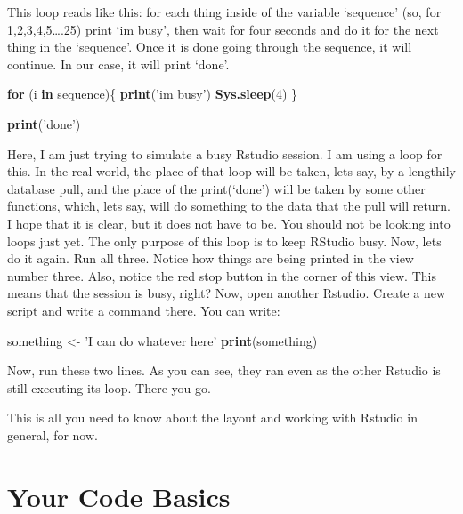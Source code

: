 \documentclass[]{book}
\newenvironment{Shaded}{\begin{snugshade}}{\end{snugshade}}
\newcommand{\ControlFlowTok}[1]{\textcolor[rgb]{0.13,0.29,0.53}{\textbf{#1}}}
\newcommand{\DecValTok}[1]{\textcolor[rgb]{0.00,0.00,0.81}{#1}}
\newcommand{\KeywordTok}[1]{\textcolor[rgb]{0.13,0.29,0.53}{\textbf{#1}}}
\newcommand{\NormalTok}[1]{#1}
\newcommand{\StringTok}[1]{\textcolor[rgb]{0.31,0.60,0.02}{#1}}
\begin{document}
This loop reads like this: for each thing inside of the variable `sequence' (so, for 1,2,3,4,5\ldots{}.25) print `im busy', then wait for four seconds and do it for the next thing in the `sequence'. Once it is done going through the sequence, it will continue. In our case, it will print `done'.

\begin{Shaded}
\begin{Highlighting}[]
\ControlFlowTok{for}\NormalTok{ (i }\ControlFlowTok{in}\NormalTok{ sequence)\{}
  \KeywordTok{print}\NormalTok{(}\StringTok{'im busy'}\NormalTok{)}
  \KeywordTok{Sys.sleep}\NormalTok{(}\DecValTok{4}\NormalTok{)}
\NormalTok{\}}

\KeywordTok{print}\NormalTok{(}\StringTok{'done'}\NormalTok{)}
\end{Highlighting}
\end{Shaded}

Here, I am just trying to simulate a busy Rstudio session. I am using a loop for this. In the real world, the place of that loop will be taken, lets say, by a lengthily database pull, and the place of the print(`done') will be taken by some other functions, which, lets say, will do something to the data that the pull will return. I hope that it is clear, but it does not have to be. You should not be looking into loops just yet. The only purpose of this loop is to keep RStudio busy. Now, lets do it again. Run all three. Notice how things are being printed in the view number three. Also, notice the red stop button in the corner of this view. This means that the session is busy, right? Now, open another Rstudio. Create a new script and write a command there. You can write:

\begin{Shaded}
\begin{Highlighting}[]
\NormalTok{something <-}\StringTok{  'I can do whatever here'}
\KeywordTok{print}\NormalTok{(something)}
\end{Highlighting}
\end{Shaded}

Now, run these two lines. As you can see, they ran even as the other Rstudio is still executing its loop. There you go.

This is all you need to know about the layout and working with Rstudio in general, for now.

\hypertarget{your-code-basics}{%
\chapter{Your Code Basics}\label{your-code-basics}}
\end{document}
